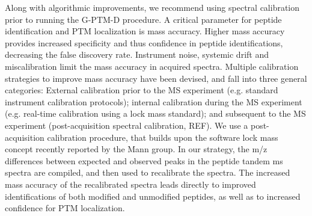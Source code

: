 \documentclass[journal=jprobs,manuscript=article]{achemso}
\begin{document}
Along with algorithmic improvements, we recommend using spectral calibration prior to running the G-PTM-D procedure.
A critical parameter for peptide identification and PTM localization is mass accuracy\cite{Scherl_2008}.
Higher mass accuracy provides increased specificity and thus confidence in peptide identifications, decreasing the false discovery rate.
Instrument noise, systemic drift and miscalibration limit the mass accuracy in acquired spectra.
Multiple calibration strategies to improve mass accuracy have been devised, and fall into three general categories:  External calibration prior to the MS experiment (e.g. standard instrument calibration protocols); internal calibration during the MS experiment (e.g. real-time calibration using a lock mass standard\cite{Olsen_2005}); and subsequent to the MS experiment (post-acquisition spectral calibration, REF).
We use a post-acquisition calibration procedure, that builds upon the software lock mass concept\cite{Cox_2011} recently reported by the Mann group.
In our strategy, the m/z differences between expected and observed peaks in the peptide tandem ms spectra are compiled, and then used to recalibrate the spectra.
The increased mass accuracy of the recalibrated spectra leads directly to improved identifications of both modified and unmodified peptides, as well as to increased confidence for PTM localization.
\end{document}
